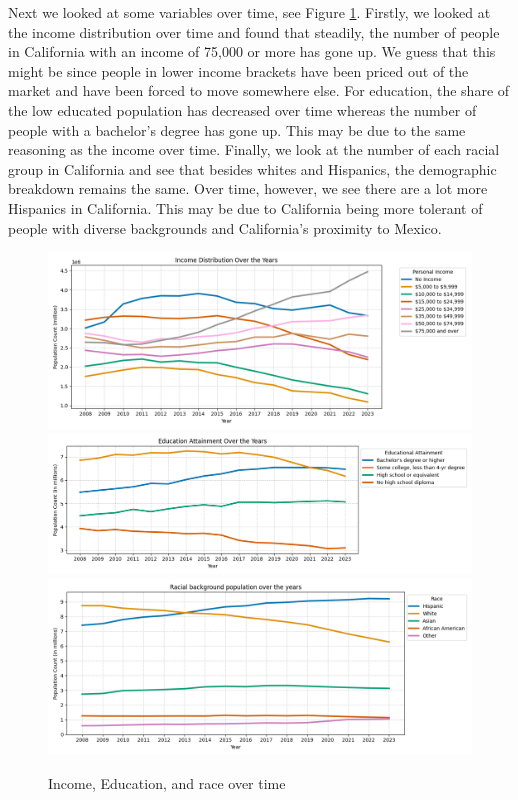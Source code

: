 \documentclass[journal]{IEEEtran}
\begin{document}
Next we looked at some variables over time, see Figure \ref{fig:ier-time}.
Firstly, we looked at the income distribution over time and found that
steadily, the number of people in California with an income of 75,000 or more
has gone up. We guess that this might be since people in lower income brackets
have been priced out of the market and have been forced to move somewhere else.
For education, the share of the low educated population has decreased over time
whereas the number of people with a bachelor's degree has gone up. This may be
due to the same reasoning as the income over time. Finally, we look at the
number of each racial group in California and see that besides whites and
Hispanics, the demographic breakdown remains the same. Over time, however, we
see there are a lot more Hispanics in California. This may be due to California
being more tolerant of people with diverse backgrounds and California’s
proximity to Mexico.

\begin{figure}
	\centering
	\includegraphics[width=1\linewidth]{income-time.png}
	\includegraphics[width=1\linewidth]{edu-time.png}
	\includegraphics[width=1\linewidth]{race-time.png}
	\caption{Income, Education, and race over time}
	\label{fig:ier-time}
\end{figure}
\end{document}
